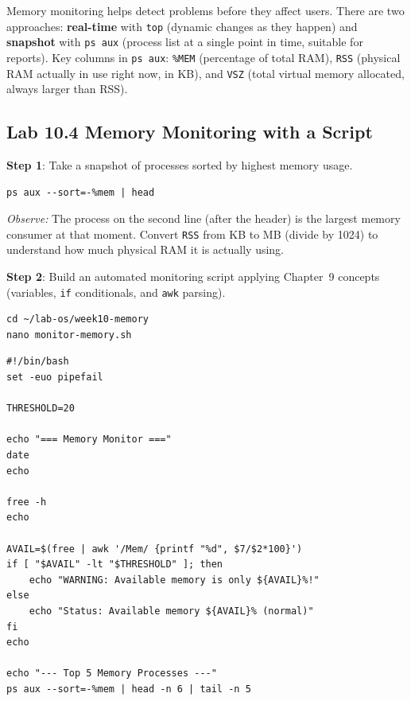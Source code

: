Memory monitoring helps detect problems before they affect users. There are two
approaches: \textbf{real-time} with \texttt{top} (dynamic changes as they happen)
and \textbf{snapshot} with \texttt{ps aux} (process list at a single point in time,
suitable for reports). Key columns in \texttt{ps aux}: \texttt{\%MEM} (percentage
of total RAM), \texttt{RSS} (physical RAM actually in use right now, in KB), and
\texttt{VSZ} (total virtual memory allocated, always larger than RSS).

\subsection*{Lab 10.4 Memory Monitoring with a Script}

\textbf{Step 1}: Take a snapshot of processes sorted by highest memory usage.

\begin{lstlisting}[caption={Processes with the highest memory usage}]
ps aux --sort=-%mem | head
\end{lstlisting}

\textit{Observe:} The process on the second line (after the header) is the largest
memory consumer at that moment. Convert \texttt{RSS} from KB to MB (divide by 1024)
to understand how much physical RAM it is actually using.

\textbf{Step 2}: Build an automated monitoring script applying Chapter~9 concepts
(variables, \texttt{if} conditionals, and \texttt{awk} parsing).

\begin{lstlisting}[caption={Navigate to directory and open nano}]
cd ~/lab-os/week10-memory
nano monitor-memory.sh
\end{lstlisting}

\begin{lstlisting}[caption={Contents of monitor-memory.sh}]
#!/bin/bash
set -euo pipefail

THRESHOLD=20

echo "=== Memory Monitor ==="
date
echo

free -h
echo

AVAIL=$(free | awk '/Mem/ {printf "%d", $7/$2*100}')
if [ "$AVAIL" -lt "$THRESHOLD" ]; then
    echo "WARNING: Available memory is only ${AVAIL}%!"
else
    echo "Status: Available memory ${AVAIL}% (normal)"
fi
echo

echo "--- Top 5 Memory Processes ---"
ps aux --sort=-%mem | head -n 6 | tail -n 5
\end{lstlisting}

